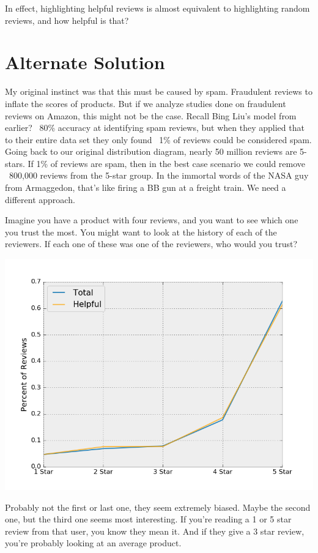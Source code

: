 \documentclass[a4paper,11pt]{article}
\begin{document}
In effect, highlighting helpful reviews is almost equivalent to highlighting random reviews, and how helpful is that?

\section*{Alternate Solution}
My original instinct was that this must be caused by spam. Fraudulent reviews to inflate the scores of products. But if we analyze studies done on fraudulent reviews on Amazon, this might not be the case. Recall Bing Liu's model from earlier? ~80\% accuracy at identifying spam reviews, but when they applied that to their entire data set they only found ~1\% of reviews could be considered spam. Going back to our original distribution diagram, nearly 50 million reviews are 5-stars. If 1\% of reviews are spam, then in the best case scenario we could remove ~800,000 reviews from the 5-star group. In the immortal words of the NASA guy from Armaggedon, that's like firing a BB gun at a freight train. We need a different approach.

Imagine you have a product with four reviews, and you want to see which one you trust the most. You might want to look at the history of each of the reviewers. If each one of these was one of the reviewers, who would you trust?

\begin{center}
    \includegraphics[scale=0.5]{helpfulness.png}
\end{center}

Probably not the first or last one, they seem extremely biased. Maybe the second one, but the third one seems most interesting. If you're reading a 1 or 5 star review from that user, you know they mean it. And if they give a 3 star review, you're probably looking at an average product.
\end{document}
